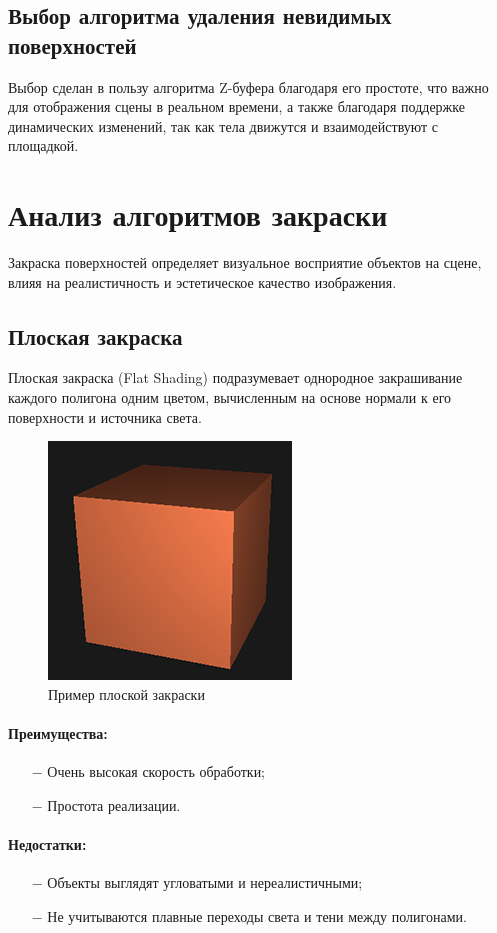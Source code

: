 \subsection{Выбор алгоритма удаления невидимых поверхностей}

Выбор сделан в пользу алгоритма Z-буфера благодаря его простоте, что важно для отображения сцены в реальном времени, а также благодаря поддержке динамических изменений, так как тела движутся и взаимодействуют с площадкой.

\section{Анализ алгоритмов закраски}

Закраска поверхностей определяет визуальное восприятие объектов на сцене, влияя на реалистичность и эстетическое качество изображения.

\subsection{Плоская закраска}

Плоская закраска (Flat Shading) подразумевает однородное закрашивание каждого полигона одним цветом, вычисленным на основе нормали к его поверхности и источника света.

\begin{figure}[H]
    \centering
    \includegraphics[width=0.2\linewidth]{img/1-4-1-flat.png}
    \caption{Пример плоской закраски }
    \label{fig:1-4-1-flat}
\end{figure}

\paragraph{Преимущества:}
\begin{itemize}
	\item[$-$] Очень высокая скорость обработки;
    \item[$-$] Простота реализации.
\end{itemize}
\paragraph{Недостатки:}
\begin{itemize}
	\item[$-$] Объекты выглядят угловатыми и нереалистичными;
    \item[$-$] Не учитываются плавные переходы света и тени между полигонами.
\end{itemize}

